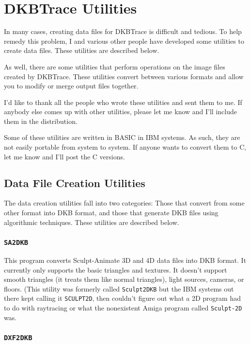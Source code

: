 \chapter{DKBTrace Utilities}

In many cases, creating data files for DKBTrace is difficult and tedious.  To
help remedy this problem, I and various other people have developed some
utilities to create data files.  These utilities are described below.

As well, there are some utilities that perform operations on the image files
created by DKBTrace.  These utilities convert between various formats and
allow you to modify or merge output files together.

I'd like to thank all the people who wrote these utilities and sent them to
me.  If anybody else comes up with other utilities, please let me know and
I'll include them in the distribution.

Some of these utilities are written in BASIC in IBM systems.  As such, they
are not easily portable from system to system.  If anyone wants to convert
them to C, let me know and I'll post the C versions.

\section{Data File Creation Utilities}

The data creation utilities fall into two categories:  Those that convert from
some other format into DKB format, and those that generate DKB files using
algorithmic techniques.  These utilities are described below.

\subsection{{\tt SA2DKB}}

This program converts Sculpt-Animate 3D and 4D data files into DKB
format.  It currently only supports the basic triangles and textures.
It doesn't support smooth triangles (it treats them like normal
triangles), light sources, cameras, or floors.  (This utility was
formerly called {\tt Sculpt2DKB} but the IBM systems out there kept
calling it {\tt SCULPT2D}, then couldn't figure out what a 2D program
had to do with raytracing or what the nonexistent Amiga program called
{\tt Sculpt-2D} was.

\subsection{{\tt DXF2DKB}}

